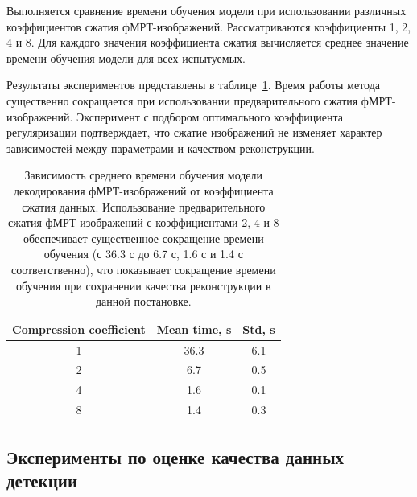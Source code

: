 Выполняется сравнение времени обучения модели при использовании различных коэффициентов сжатия фМРТ-изображений.
Рассматриваются коэффициенты 1, 2, 4 и 8.
Для каждого значения коэффициента сжатия вычисляется среднее значение времени обучения модели для всех испытуемых.

Результаты экспериментов представлены в таблице~\ref{table:coeffs}.
Время работы метода существенно сокращается при использовании предварительного сжатия фМРТ-изображений.
Эксперимент с подбором оптимального коэффициента регуляризации подтверждает, что сжатие изображений не изменяет характер зависимостей между параметрами и качеством реконструкции.

\begin{table}[h!t]\center
    \caption{Зависимость среднего времени обучения модели декодирования фМРТ-изображений от коэффициента сжатия данных. Использование предварительного сжатия фМРТ-изображений с коэффициентами 2, 4 и 8 обеспечивает существенное сокращение времени обучения (с 36.3 с до 6.7 с, 1.6 с и 1.4 с соответственно), что показывает сокращение времени обучения при сохранении качества реконструкции в данной постановке.}\label{table:coeffs}
    \begin{tabular}{@{}ccc@{}}
    \toprule
    Compression coefficient & Mean time, s & Std, s \\
    \midrule
    1 & 36.3 & 6.1 \\
    2 & 6.7 & 0.5 \\
    4 & 1.6 & 0.1 \\
    8 & 1.4 & 0.3 \\
    \bottomrule
    \end{tabular}
\end{table}

\subsection{Эксперименты по оценке качества данных детекции}

